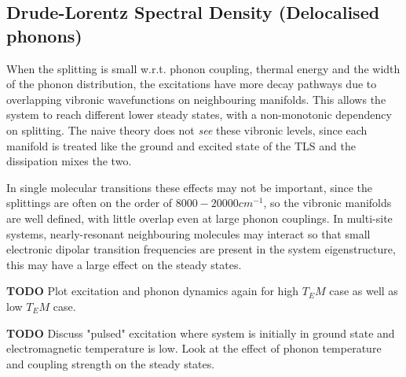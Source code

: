\documentclass[]{article}
\begin{document}
\begin{itemize}
\begin{itemize}
\subsection{Drude-Lorentz Spectral Density (Delocalised phonons)}

When the splitting is small w.r.t. phonon coupling, thermal energy and the width of the phonon distribution, the excitations have more decay pathways due to overlapping vibronic wavefunctions on neighbouring manifolds. This allows the system to reach different lower steady states, with a non-monotonic dependency on splitting. The naive theory does not \emph{see} these vibronic levels, since each manifold is treated like the ground and excited state of the TLS and the dissipation mixes the two.

In single molecular transitions these effects may not be important, since the splittings are often on the order of $8000-20000 cm^{-1}$, so the vibronic manifolds are well defined, with little overlap even at large phonon couplings. In multi-site systems, nearly-resonant neighbouring molecules may interact so that small electronic dipolar transition frequencies are present in the system eigenstructure, this may have a large effect on the steady states.

\textbf{TODO}
Plot excitation and phonon dynamics again for high $T_EM$ case as well as low $T_EM$ case.

\textbf{TODO}
Discuss "pulsed" excitation where system is initially in ground state and electromagnetic temperature is low. Look at the effect of phonon temperature and coupling strength on the steady states.

\end{itemize}
\end{itemize}
\end{document}
